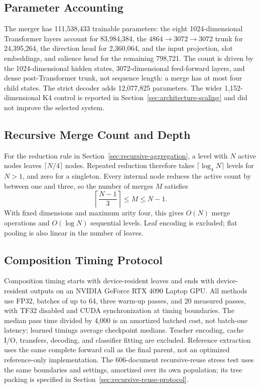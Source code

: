\documentclass[10pt]{article}
\begin{document}
\subsection{Parameter Accounting}
\label{app:parameter-accounting}

The merger has 111,538,433 trainable parameters: the eight 1024-dimensional
Transformer layers account for 83,984,384, the
\(4864\rightarrow3072\rightarrow3072\) trunk for 24,395,264, the direction
head for 2,360,064, and the input projection, slot embeddings, and salience
head for the remaining 798,721. The count is driven by the 1024-dimensional
hidden states, 3072-dimensional feed-forward layers, and dense
post-Transformer trunk, not sequence length: a merge has at most four child
states. The strict decoder adds 12,077,825 parameters. The wider
1,152-dimensional K4 control is reported in
Section~\ref{sec:architecture-scaling} and did not improve the selected system.

\subsection{Recursive Merge Count and Depth}
\label{app:merge-complexity}

For the reduction rule in Section~\ref{sec:recursive-aggregation}, a level
with \(N\) active nodes leaves \(\lceil N/4\rceil\) nodes. Repeated reduction
therefore takes \(\lceil\log_4 N\rceil\) levels for \(N>1\), and zero for
a singleton. Every internal node reduces the active count by between one and
three, so the number of merges \(M\) satisfies
\[
 \left\lceil\frac{N-1}{3}\right\rceil\leq M\leq N-1.
\]
With fixed dimensions and maximum arity four, this gives \(O(N)\) merge
operations and \(O(\log N)\) sequential levels. Leaf encoding is excluded;
flat pooling is also linear in the number of leaves.

\subsection{Composition Timing Protocol}
\label{app:composition-timing}

Composition timing starts with device-resident leaves and ends with
device-resident outputs on an NVIDIA GeForce RTX 4090 Laptop GPU. All methods
use FP32, batches of up to 64, three warm-up passes, and 20 measured passes,
with TF32 disabled and CUDA synchronization at timing boundaries. The median
pass time divided by 4,000 is an amortized batched cost, not batch-one latency;
learned timings average checkpoint medians. Teacher encoding, cache I/O,
transfers, decoding, and classifier fitting are excluded. Reference extraction
uses the same complete forward call as the final parent, not an optimized
reference-only implementation. The 606-document recursive-reuse stress test
uses the same boundaries and settings, amortized over its own population;
its tree packing is specified in Section~\ref{sec:recursive-reuse-protocol}.
\end{document}

